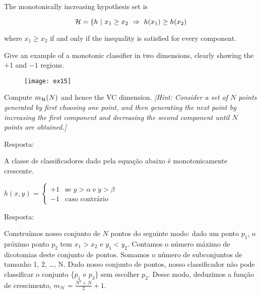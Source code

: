 \begin{enunciado}{15}
    The monotonically increasing hypothesis set is
    
    $$ \mathcal{H} = \{ h~|~ x_1 \ge x_2 ~ \Rightarrow ~ h(x_1) \ge h(x_2) $$
    
    where $x_1 \ge x_2$ if and only if the inequality is satisfied for every component.
    
     Give an example of a monotonic classifier in two dimensions, clearly showing the $+1$ and $-1$ regions.

    	
    \begin{figure}[h]
	    \texttt{[image: ex15]}
    \end{figure}

    
     Compute $m_{\mathcal{H}}(N)$ and hence the VC dimension. \textit{[Hint: Consider a set of $N$ points generated by first choosing one point, and then generating the next point by increasing the first component and decreasing the second component until $N$ points are obtained.]}

\end{enunciado}
     Resposta:
    
    A classe de classificadores dado pela equação abaixo é monotonicamente crescente.

   $h(x, y)$ = 
    $
    \begin{cases}
	    +1 &\mbox{se } y > \alpha \; \text{e} \; y > \beta  \\ 
	    -1 &\mbox{caso contrário }
    \end{cases}
    $
    
     Resposta:

    Construímos nosso conjunto de $N$ pontos do seguinte modo: dado um ponto $p_1$, o próximo ponto $p_2$ tem $x_1 > x_2$ e $y_1 < y_2$. Contamos o número máximo de dicotomias deste conjunto de pontos. Somamos o número de subconjuntos de tamanho 1, 2, \ldots, N. Dado nosso conjunto de pontos, nosso classificador não pode classificar o conjunto \{$p_1$ e $p_3$\} sem escolher $p_2$. Desse modo, deduzimos a função de crescimento, $m_{\mathcal{H}} = \frac{N^2+N}{2}+1$.



